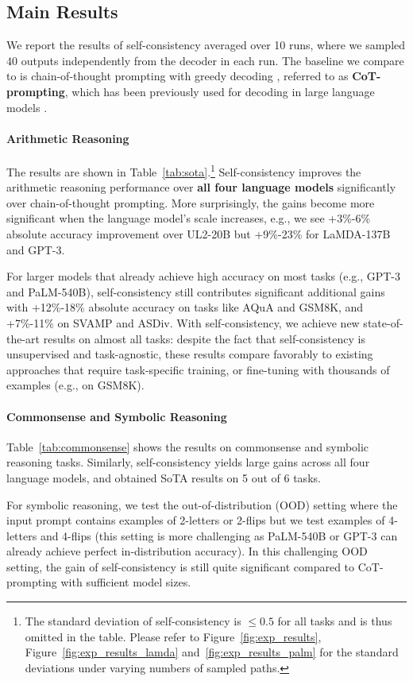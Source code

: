 \subsection{Main Results} We report the results of self-consistency averaged over 10 runs, where we sampled 40 outputs independently from the decoder in each run. The baseline we compare to is chain-of-thought prompting with greedy decoding \citep{wei2022chain}, referred to as \textbf{CoT-prompting}, which has been previously used for decoding in large language models \citep{palm}.

\paragraph{Arithmetic Reasoning} The results are shown in Table~\ref{tab:sota}.\footnote{The standard deviation of  self-consistency is $\leq0.5$ for all tasks and is thus omitted in the table. Please refer to Figure~\ref{fig:exp_results}, Figure~\ref{fig:exp_results_lamda} and~\ref{fig:exp_results_palm} for the standard deviations under varying numbers of sampled paths.} Self-consistency improves the arithmetic reasoning performance over \textbf{all four language models} significantly over chain-of-thought prompting. More surprisingly, the gains become more significant when the language model's scale increases, e.g., we see +3\%-6\% absolute accuracy improvement over UL2-20B but +9\%-23\% for LaMDA-137B and GPT-3.

For larger models that already achieve high accuracy on most tasks (e.g., GPT-3 and PaLM-540B), self-consistency still contributes significant additional gains with +12\%-18\% absolute accuracy on tasks like AQuA and GSM8K, and +7\%-11\% on SVAMP and ASDiv. With self-consistency, we achieve new state-of-the-art results on almost all tasks: despite the fact that self-consistency is unsupervised and task-agnostic, these results compare favorably to existing approaches that require task-specific training, or fine-tuning with thousands of examples (e.g., on GSM8K).

\paragraph{Commonsense and Symbolic Reasoning}
Table~\ref{tab:commonsense} shows the results on commonsense and symbolic reasoning tasks. Similarly, self-consistency yields large gains across all four language models, and obtained SoTA results on 5 out of 6 tasks.

For symbolic reasoning, we test the out-of-distribution (OOD) setting where the input prompt contains examples of 2-letters or 2-flips but we test examples of 4-letters and 4-flips (this setting is more challenging as PaLM-540B or GPT-3 can already achieve perfect in-distribution accuracy). In this challenging OOD setting, the gain of self-consistency is still quite significant compared to CoT-prompting with sufficient model sizes.

